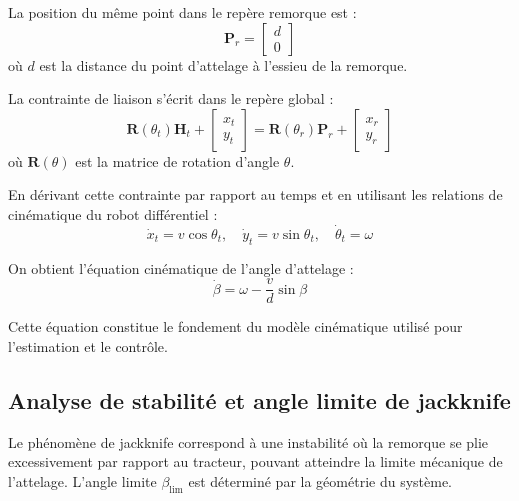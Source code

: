 \documentclass[a4paper,12pt]{report}
\begin{document}
La position du même point dans le repère remorque est :
\begin{equation}
    \mathbf{P}_r = \begin{bmatrix} d \\ 0 \end{bmatrix}
    \label{eq:position_attelage_remorque}
\end{equation}
où $d$ est la distance du point d'attelage à l'essieu de la remorque.

La contrainte de liaison s'écrit dans le repère global :
\begin{equation}
    \mathbf{R}(\theta_t) \mathbf{H}_t + \begin{bmatrix} x_t \\ y_t \end{bmatrix} = \mathbf{R}(\theta_r) \mathbf{P}_r + \begin{bmatrix} x_r \\ y_r \end{bmatrix}
    \label{eq:contrainte_liaison}
\end{equation}
où $\mathbf{R}(\theta)$ est la matrice de rotation d'angle $\theta$.

En dérivant cette contrainte par rapport au temps et en utilisant les relations de cinématique du robot différentiel :
\begin{equation}
    \dot{x}_t = v \cos\theta_t, \quad \dot{y}_t = v \sin\theta_t, \quad \dot{\theta}_t = \omega
    \label{eq:cinematique_tracteur}
\end{equation}

On obtient l'équation cinématique de l'angle d'attelage :
\begin{equation}
    \dot{\beta} = \omega - \frac{v}{d} \sin\beta
    \label{eq:beta_dot}
\end{equation}

Cette équation constitue le fondement du modèle cinématique utilisé pour l'estimation et le contrôle.

\subsection{Analyse de stabilité et angle limite de jackknife}
\label{subsec:angle_limite_jackknife}

Le phénomène de jackknife correspond à une instabilité où la remorque se plie excessivement par rapport au tracteur, pouvant atteindre la limite mécanique de l'attelage. L'angle limite $\beta_{\text{lim}}$ est déterminé par la géométrie du système.
\end{document}
